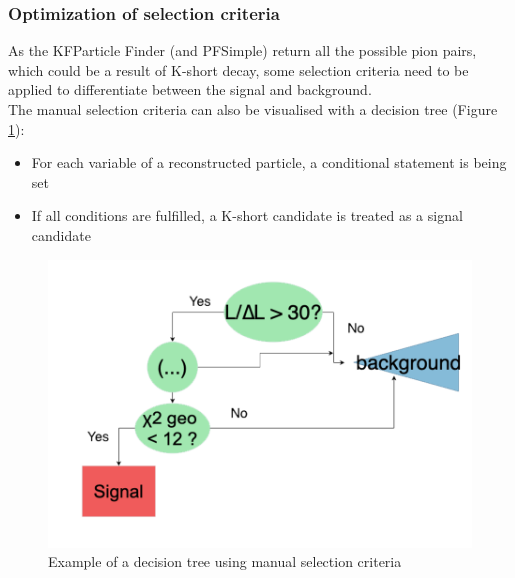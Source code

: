 \subsubsection{Optimization of selection criteria}
As the KFParticle Finder (and PFSimple) return all the possible pion pairs, which could be a result of K-short decay,  some selection criteria need to be applied to differentiate between the signal and background.\\

The manual selection criteria can also be visualised with a decision tree (Figure \ref{manual tree}):
\begin{itemize}
    \item For each variable of a reconstructed particle, a conditional statement is being set
    \item If all conditions are fulfilled, a K-short candidate is treated as a signal  candidate
\end{itemize}

\begin{figure}[H]
    \centering
    \includegraphics[width=.6\textwidth]{img/decision_tree.png}
    \caption{Example of a decision tree using manual selection criteria}
    \label{manual tree}
\end{figure}

